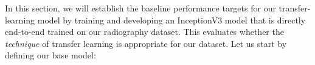 In this section, we will establish the baseline performance targets for our transfer-learning model by training and developing 
an InceptionV3 model that is directly end-to-end trained on our radiography dataset. 
This evaluates whether the \emph{technique} of transfer learning is appropriate for our dataset. 
Let us start by defining our base model:



% 


% 


